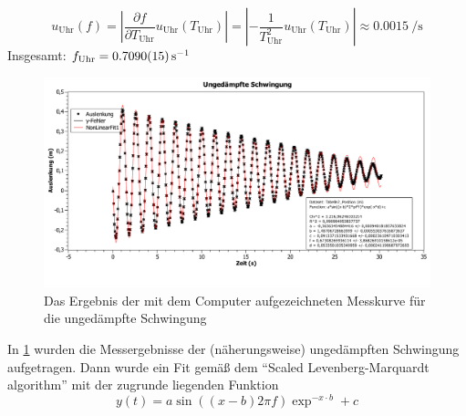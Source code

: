 \documentclass[
	a4paper,
	12pt,
	pagesize,
	ngerman
]{scrartcl}
\begin{document}
	\begin{equation*}
		u_\text{Uhr}(f) = \left|  \frac{\partial f}{\partial T_\text{Uhr}} u_\text{Uhr}(T_\text{Uhr}) \right| = \left| - \frac{1}{T_\text{Uhr}^2}u_\text{Uhr}(T_\text{Uhr}) \right| \approx \SI{0,0015}{\per \second} %
	\end{equation*}
	Insgesamt: $f_\text{Uhr} = \SI{0,709 \pm 0,0015}{\per \second}  $ \\
	\begin{figure}[htb]
		\includegraphics[width=1\textwidth]{Ungedaempfte_Schwingung_Graph}
		\centering
		\caption{Das Ergebnis der mit dem Computer aufgezeichneten Messkurve für die ungedämpfte Schwingung}
		\label{ungedämpfte_Schwingung}
		\centering
	\end{figure}
	In \cref{ungedämpfte_Schwingung} wurden die Messergebnisse der (näherungsweise) ungedämpften Schwingung aufgetragen. Dann wurde ein Fit gemäß dem \enquote{Scaled Levenberg-Marquardt algorithm} mit der zugrunde liegenden Funktion
	\begin{equation}
	y(t) = a \sin ((x-b)2 \pi f) \exp^{-x \cdot b} + c
	\end{equation}
	
\end{document}
